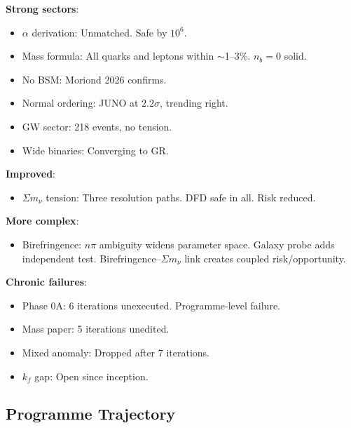 \documentclass[11pt,a4paper]{article}
\begin{document}
\begin{tcolorbox}[colback=green!5!white, colframe=green!60!black,
  title={Theory Health: Stable, Birefringence More Complex, $\Sigma m_\nu$ Improved}]

\textbf{Strong sectors}:
\begin{itemize}
\item $\alpha$ derivation: Unmatched. Safe by $10^6$.
\item Mass formula: All quarks and leptons within $\sim$1--3\%. $n_b = 0$ solid.
\item No BSM: Moriond 2026 confirms.
\item Normal ordering: JUNO at $2.2\sigma$, trending right.
\item GW sector: 218 events, no tension.
\item Wide binaries: Converging to GR.
\end{itemize}

\textbf{Improved}:
\begin{itemize}
\item $\Sigma m_\nu$ tension: Three resolution paths. DFD safe in all. Risk reduced.
\end{itemize}

\textbf{More complex}:
\begin{itemize}
\item Birefringence: $n\pi$ ambiguity widens parameter space. Galaxy probe adds independent test. Birefringence--$\Sigma m_\nu$ link creates coupled risk/opportunity.
\end{itemize}

\textbf{Chronic failures}:
\begin{itemize}
\item Phase 0A: 6 iterations unexecuted. Programme-level failure.
\item Mass paper: 5 iterations unedited.
\item Mixed anomaly: Dropped after 7 iterations.
\item $k_f$ gap: Open since inception.
\end{itemize}
\end{tcolorbox}

\subsection{Programme Trajectory}
\end{document}
